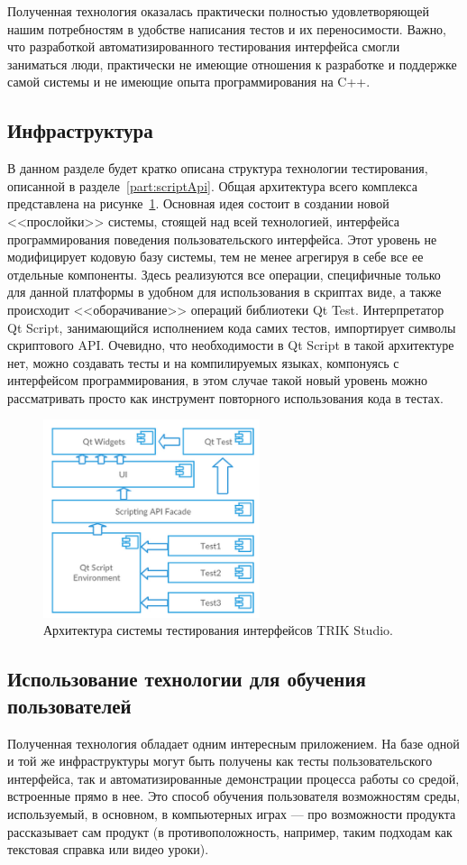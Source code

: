 \documentclass[conference]{IEEEtran}
\begin{document}
Полученная технология оказалась практически полностью удовлетворяющей нашим потребностям в удобстве написания 
тестов и их переносимости. Важно, что разработкой автоматизированного тестирования интерфейса смогли заниматься 
люди, практически не имеющие отношения к разработке и поддержке самой системы и не имеющие опыта программирования на C++.

\subsection{Инфраструктура}
В данном разделе будет кратко описана структура технологии тестирования, описанной в разделе~\ref{part:scriptApi}. 
Общая архитектура всего комплекса представлена на рисунке~\ref{image:architecture}. Основная идея состоит 
в создании новой <<прослойки>> системы, стоящей над всей технологией, интерфейса программирования поведения 
пользовательского интерфейса. Этот уровень не модифицирует кодовую базу системы, тем не менее агрегируя в 
себе все ее отдельные компоненты. Здесь реализуются все операции, специфичные только для данной платформы 
в удобном для использования в скриптах виде, а также происходит <<оборачивание>> операций библиотеки Qt Test. 
Интерпретатор Qt Script, занимающийся исполнением кода самих тестов, импортирует символы скриптового API. 
Очевидно, что необходимости в Qt Script в такой архитектуре нет, можно создавать тесты и на компилируемых 
языках, компонуясь с интерфейсом программирования, в этом случае такой новый уровень можно рассматривать 
просто как инструмент повторного использования кода в тестах.

\begin{figure}[!t]
	\centering
	\includegraphics[width=2.5in]{guiTestingArchitecture.png}
	\caption{Архитектура системы тестирования интерфейсов TRIK Studio.}
	\label{image:architecture}
\end{figure}

\subsection{Использование технологии для обучения пользователей}
\label{part:demos}
Полученная технология обладает одним интересным приложением. На базе одной и той же инфраструктуры могут 
быть получены как тесты пользовательского интерфейса, так и автоматизированные демонстрации процесса работы 
со средой, встроенные прямо в нее. Это способ обучения пользователя возможностям среды, используемый, в 
основном, в компьютерных играх --- про возможности продукта рассказывает сам продукт (в противоположность, 
например, таким подходам как текстовая справка или видео уроки).
\end{document}
